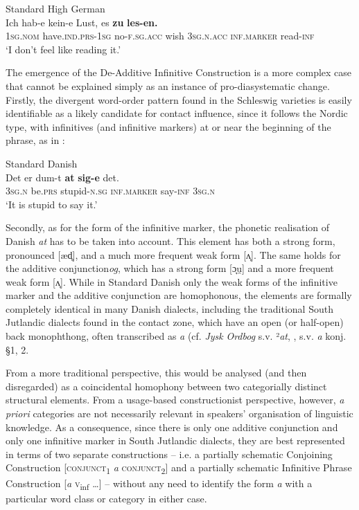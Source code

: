 \documentclass[output=paper]{langsci/langscibook}
\begin{document}
\ea\label{ex:hoeder:8}
	Standard High German\\
	\gll Ich hab-e kein-e Lust,{} es \textbf{zu} \textbf{les-en.}\\
     1\textsc{sg.nom} have.\textsc{ind.prs}{}-1\textsc{sg} no\textsc{{}-f.sg.acc} wish 3\textsc{sg.n.acc} \textsc{inf.marker} read-\textsc{inf}\\
	\glt `I don’t feel like reading it.'
\z

The emergence of the De-Additive Infinitive Construction is a more complex case that cannot be explained simply as an instance of pro-diasystematic change. Firstly, the divergent word-order pattern found in the Schleswig varieties is easily identifiable as a likely candidate for contact influence, since it follows the Nordic type, with infinitives (and infinitive markers) at or near the beginning of the phrase, as in :

\ea\label{ex:hoeder:9}
	Standard Danish\\
	\gll Det er dum-t \textbf{at} \textbf{sig-e} det.\\
     3\textsc{sg.n} be.\textsc{prs} stupid-\textsc{n.sg} \textsc{inf.marker} say-\textsc{inf} 3\textsc{sg.n}\\
	\glt `It is stupid to say it.'
\z

Secondly, as for the form of the infinitive marker, the phonetic realisation of Danish \textit{at} has to be taken into account. This element has both a strong form, pronounced {[}æd̥{]}, and a much more frequent weak form {[}ʌ̞{]}. The same holds for the additive conjunction\textit{og}, which has a strong form {[}ɔ̞u̯{]} and a more frequent weak form {[}ʌ̞{]}. While in Standard Danish only the weak forms of the infinitive marker and the additive conjunction are homophonous, the elements are formally completely identical in many Danish dialects, including the traditional South Jutlandic dialects found in the contact zone, which have an open (or half-open) back monophthong, often transcribed as \textit{a} (cf. \textit{Jysk} \textit{Ordbog} s.v. ²\textit{at}, \citealt{BjerrumBjerrum1974}, s.v. \textit{a} konj. \S 1, 2. 

From a more traditional perspective, this would be analysed (and then disregarded) as a coincidental homophony between two categorially distinct structural elements. From a usage-based constructionist perspective, however, \textit{a} \textit{priori} categories are not necessarily relevant in speakers’ organisation of linguistic knowledge. As a consequence, since there is only one additive conjunction and only one infinitive marker in South Jutlandic dialects, they are best represented in terms of two separate constructions – i.e. a partially schematic Conjoining Construction {[}\textsc{conjunct}\textsc{\textsubscript{1}} \textit{a} \textsc{conjunct}\textsc{\textsubscript{2}}{]} and a partially schematic Infinitive Phrase Construction {[}\textit{a} \textsc{v}\textsubscript{inf} …{]} – without any need to identify the form \textit{a} with a particular word class or category in either case.
\end{document}
